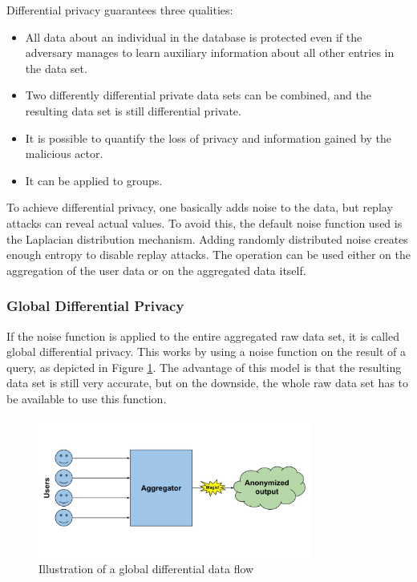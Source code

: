 Differential privacy guarantees three qualities:
\begin{itemize}
    \item All data about an individual in the database is protected even if the adversary manages to learn auxiliary information about all other entries in the data set.
    \item Two differently differential private data sets can be combined, and the resulting data set is still differential private.
    \item It is possible to quantify the loss of privacy and information gained by the malicious actor.
    \item It can be applied to groups.
\end{itemize}

To achieve differential privacy, one basically adds noise to the data, but replay attacks can reveal actual values. To avoid this, the default noise function used is the Laplacian distribution mechanism. Adding randomly distributed noise creates enough entropy to disable replay attacks. The operation can be used either on the aggregation of the user data or on the aggregated data itself.

\subsubsection{Global Differential Privacy}

If the noise function is applied to the entire aggregated raw data set, it is called global differential privacy. This works by using a noise function on the result of a query, as depicted in Figure \ref{fig:global_diff}. The advantage of this model is that the resulting data set is still very accurate, but on the downside, the whole raw data set has to be available to use this function.

\begin{figure}[htpb]
  \centering
  \includegraphics[width=0.8\textwidth]{figures/global_diff.png}
  \caption{Illustration of a global differential data flow} \label{fig:global_diff}
\end{figure}

